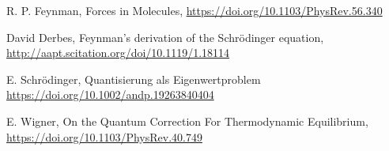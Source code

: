 \item
  R. P. Feynman,
  Forces in Molecules,
  \url{https://doi.org/10.1103/PhysRev.56.340}
\item
  David Derbes,
  Feynman’s derivation of the Schrödinger equation,
  \url{http://aapt.scitation.org/doi/10.1119/1.18114}
\item
  E. Schrödinger,
  Quantisierung als Eigenwertproblem
  \url{https://doi.org/10.1002/andp.19263840404}

\item
  E. Wigner,
  On the Quantum Correction For Thermodynamic Equilibrium,
  \url{ https://doi.org/10.1103/PhysRev.40.749 }

